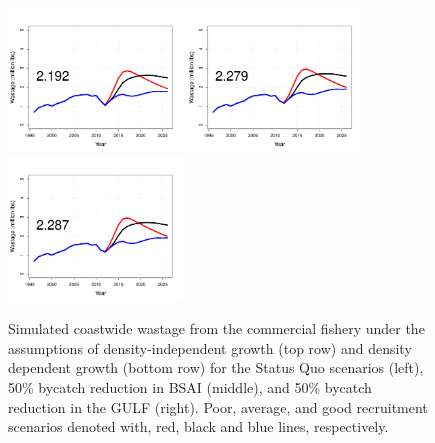 \begin{figure}[htbp]
		\includegraphics[height=1.5in]{../FIGURES/fig_SQUO_DD_WBio.pdf}
		\includegraphics[height=1.5in]{../FIGURES/fig_BSAI_DD_WBio.pdf}
		\includegraphics[height=1.5in]{../FIGURES/fig_GULF_DD_WBio.pdf}
	\caption{Simulated coastwide wastage from the commercial fishery under the assumptions of density-independent growth (top row) and density dependent growth (bottom row) for the Status Quo scenarios (left), 50\% bycatch reduction in BSAI (middle), and 50\% bycatch reduction in the GULF (right).  Poor, average, and good recruitment scenarios denoted with, red, black and blue lines, respectively.}
	\label{fig:FIGURES_fig_SQUO_DI_WBio}
\end{figure}

























